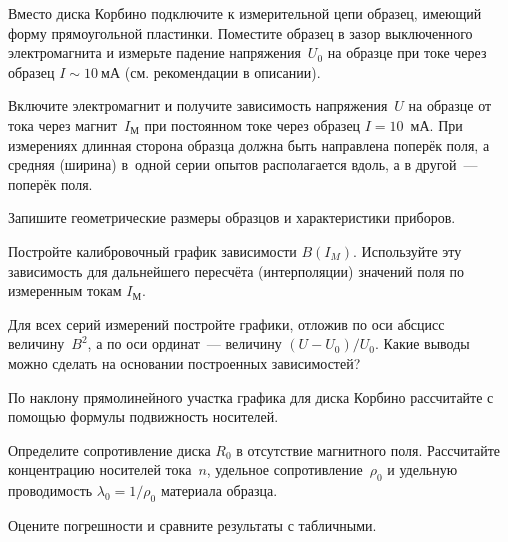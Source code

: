 \begin{lab:task}
\item Вместо диска Корбино подключите к измерительной цепи образец, имеющий
форму прямоугольной пластинки. Поместите образец в зазор выключенного 
электромагнита и измерьте падение напряжения~$U_0$ на образце 
при токе через образец $I\sim 10~мА$ (см. рекомендации в описании).

\item Включите электромагнит и получите зависимость напряжения~$U$ на образце от
тока через магнит~$I_{М}$ при постоянном токе через образец $I=10$~мА. 
При измерениях длинная сторона образца должна быть направлена поперёк поля, 
а средняя (ширина) в~одной серии опытов располагается вдоль, 
а в другой~--- поперёк поля.

\item Запишите геометрические размеры образцов и характеристики приборов.


\item Постройте калибровочный график зависимости $B(I_{M})$. 
    Используйте эту зависимость для дальнейшего пересчёта (интерполяции)
    значений поля по измеренным токам $I_{М}$.

\item Для всех серий измерений постройте графики, отложив по оси абсцисс
величину~$B^2$, а по оси ординат~--- величину $(U-U_0)/U_0$. Какие выводы
можно сделать на основании построенных зависимостей?

\item По наклону прямолинейного участка графика для диска Корбино рассчитайте
с помощью формулы  подвижность носителей.

\item Определите сопротивление диска $R_0$ в отсутствие магнитного поля.
Рассчитайте концентрацию носителей тока~$n$, удельное сопротивление~$\rho_0$ 
и удельную проводимость $\lambda_0=1/\rho_0$ материала образца.

\item Оцените погрешности и сравните результаты с табличными.

\end{lab:task}


